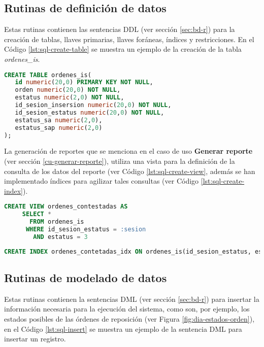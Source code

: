 \subsection{Rutinas de definición de datos}
Estas rutinas contienen las sentencias DDL (ver sección \ref{sec:bd-r}) para la creación de tablas, llaves primarias, llaves foráneas, índices y restricciones. En el Código \ref{lst:sql-create-table} se muestra un ejemplo de la creación de la tabla \textit{ordenes\_is}.
\begin{lstlisting}[language=SQL, caption={Sentencia para crear una tabla.}, captionpos=b, label={lst:sql-create-table}]
CREATE TABLE ordenes_is(
   id numeric(20,0) PRIMARY KEY NOT NULL,
   orden numeric(20,0) NOT NULL,
   estatus numeric(2,0) NOT NULL,
   id_sesion_insersion numeric(20,0) NOT NULL,
   id_sesion_estatus numeric(20,0) NOT NULL,
   estatus_sa numeric(2,0),
   estatus_sap numeric(2,0)
);
\end{lstlisting}

La generación de reportes que se menciona en el caso de uso \textbf{Generar reporte} (ver sección \ref{cu-generar-reporte}), utiliza una vista para la definición de la consulta de los datos del reporte (ver Código \ref{lst:sql-create-view}, además se han implementado índices para agilizar tales consultas (ver Código \ref{lst:sql-create-index}).

\begin{lstlisting}[language=SQL, caption={Sentencia para crear una vista.}, captionpos=b, label={lst:sql-create-view}]
CREATE VIEW ordenes_contestadas AS
     SELECT *
       FROM ordenes_is
      WHERE id_sesion_estatus = :sesion
        AND estatus = 3
\end{lstlisting}

\begin{lstlisting}[language=SQL, caption={Sentencia para crear un índice.}, captionpos=b, label={lst:sql-create-index}]
CREATE INDEX ordenes_contetadas_idx ON ordenes_is(id_sesion_estatus, estatus);
\end{lstlisting}

\subsection{Rutinas de modelado de datos}
Estas rutinas contienen la sentencias DML (ver sección \ref{sec:bd-r}) para insertar la información necesaria para la ejecución del sistema, como son, por ejemplo, los estados posibles de las órdenes de reposición (ver Figura \ref{fig:dia-estados-orden}), en el Código \ref{lst:sql-insert} se muestra un ejemplo de la sentencia DML para insertar un registro.

